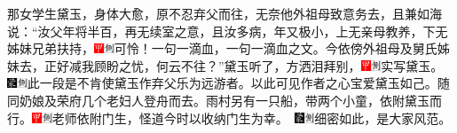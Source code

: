那女学生黛玉，身体大愈，原不忍弃父而往，无奈他外祖母致意务去，且兼如海说：“汝父年将半百，再无续室之意，且汝多病，年又极小，上无亲母教养，下无姊妹兄弟扶持，{\includegraphics[width=3mm]{../Images/00002}\includegraphics[width=3mm]{../Images/00011}\footnotesize \kaishu 可怜！一句一滴血，一句一滴血之文。}今依傍外祖母及舅氏姊妹去，正好减我顾盼之忧，何云不往？”黛玉听了，方洒泪拜别，{{\includegraphics[width=3mm]{../Images/00002}\includegraphics[width=3mm]{../Images/00011}\footnotesize \kaishu 实写黛玉。　}\includegraphics[width=3mm]{../Images/00006}\includegraphics[width=3mm]{../Images/00011}\footnotesize \kaishu 此一段是不肯使黛玉作弃父乐为远游者。以此可见作者之心宝爱黛玉如己。}随同奶娘及荣府几个老妇人登舟而去。雨村另有一只船，带两个小童，依附黛玉而行。{{\includegraphics[width=3mm]{../Images/00002}\includegraphics[width=3mm]{../Images/00011}\footnotesize \kaishu 老师依附门生，怪道今时以收纳门生为幸。　}\includegraphics[width=3mm]{../Images/00006}\includegraphics[width=3mm]{../Images/00011}\footnotesize \kaishu 细密如此，是大家风范。}

